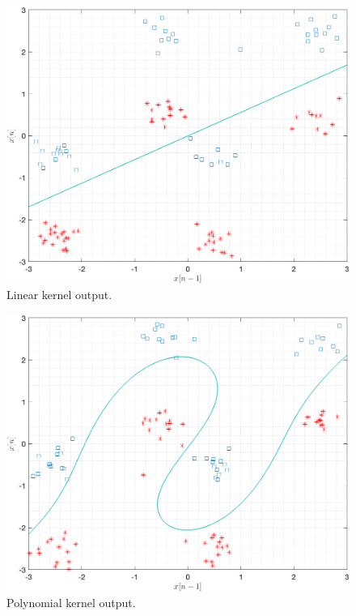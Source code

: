 \documentclass[11pt]{article}
\begin{document}
\begin{figure}[h!]
    \centering
    \includegraphics[width=\textwidth]{figure01.png}
    \caption{Linear kernel output.}
    \label{fig:linear}
\end{figure}

\begin{figure}[h!]
    \centering
    \includegraphics[width=\textwidth]{figure02.2.png}
    \caption{Polynomial kernel output.}
    \label{fig:poly}
\end{figure}
\end{document}
